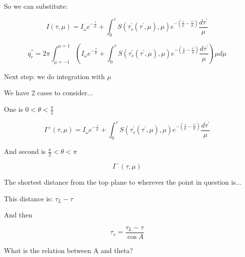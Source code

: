 \documentclass[12pt]{article}
\renewcommand{\_}{\kern-1.5pt\textunderscore\kern-1.5pt}
\begin{document}
So we can substitute:\par

 \[ I \left(  \tau, \mu  \right) =I_{ \omega }e^{-\frac{ \tau}{ \mu }}+ \int _{0}^{ \tau}S \left(  \tau_{s}^{'} \left(  \tau^{'}, \mu  \right) , \mu  \right) e^{- \left( \frac{ \tau}{ \mu }-\frac{ \tau'}{ \mu } \right) }\frac{d \tau^{'}}{ \mu } \] \par

 \[ q_{r}^{''}=2 \pi  \int _{ \mu =-1}^{ \mu =1} \left( I_{ \omega }e^{-\frac{ \tau}{ \mu }}+ \int _{0}^{ \tau}S \left(  \tau_{s}^{'} \left(  \tau^{'}, \mu  \right) , \mu  \right) e^{- \left( \frac{ \tau}{ \mu }-\frac{ \tau'}{ \mu } \right) }\frac{d \tau^{'}}{ \mu } \right)   \mu  d \mu  \] \par

Next step: we do integration with  \(  \mu  \) \par

\par

\par

We have 2 cases to consider$ \ldots $ \par

One is  \( 0< \theta <\frac{ \pi }{2} \) \par

 \[ I^{+} \left(  \tau, \mu  \right) =I_{ \omega }e^{-\frac{ \tau}{ \mu }}+ \int _{0}^{ \tau}S \left(  \tau_{s}^{'} \left(  \tau^{'}, \mu  \right) , \mu  \right) e^{- \left( \frac{ \tau}{ \mu }-\frac{ \tau'}{ \mu } \right) }\frac{d \tau^{'}}{ \mu } \] \par

And second is  \( \frac{ \pi }{2}< \theta < \pi  \) \par

 \[ I^{-} \left(  \tau, \mu  \right)  \] \par

The shortest distance from the top plane to wherever the point in question is$ \ldots $ \par

This distance is:  \(  \tau_{L}- \tau \) \par

And then\par

 \[  \tau_{s}=\frac{ \tau_{L}- \tau}{\cos A} \] \par

\par

What is the relation between A and theta?\par
\end{document}
